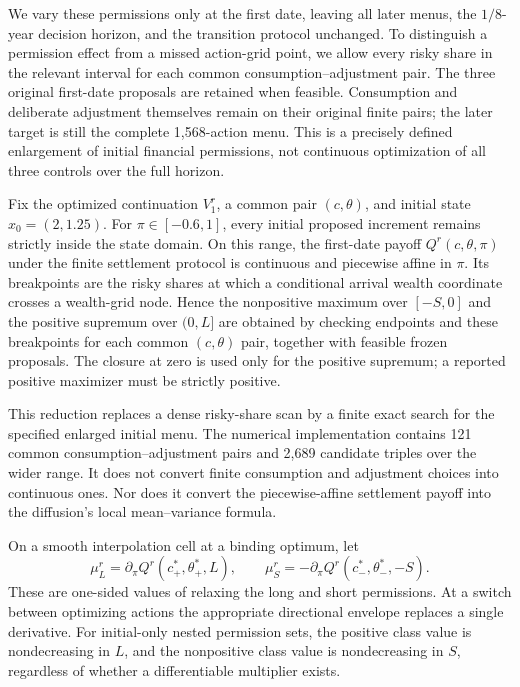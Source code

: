 We vary these permissions only at the first date, leaving all later menus, the $1/8$-year decision horizon, and the transition protocol unchanged. To distinguish a permission effect from a missed action-grid point, we allow every risky share in the relevant interval for each common consumption--adjustment pair. The three original first-date proposals are retained when feasible. Consumption and deliberate adjustment themselves remain on their original finite pairs; the later target is still the complete 1,568-action menu. This is a precisely defined enlargement of initial financial permissions, not continuous optimization of all three controls over the full horizon.

\begin{proposition}
\label{prop:r9_knots}
Fix the optimized continuation $V^r_1$, a common pair $(c,\theta)$, and initial state $x_0=(2,1.25)$. For $\pi\in[-0.6,1]$, every initial proposed increment remains strictly inside the state domain. On this range, the first-date payoff $Q^r(c,\theta,\pi)$ under the finite settlement protocol is continuous and piecewise affine in $\pi$. Its breakpoints are the risky shares at which a conditional arrival wealth coordinate crosses a wealth-grid node. Hence the nonpositive maximum over $[-S,0]$ and the positive supremum over $(0,L]$ are obtained by checking endpoints and these breakpoints for each common $(c,\theta)$ pair, together with feasible frozen proposals. The closure at zero is used only for the positive supremum; a reported positive maximizer must be strictly positive.
\end{proposition}

This reduction replaces a dense risky-share scan by a finite exact search for the specified enlarged initial menu. The numerical implementation contains 121 common consumption--adjustment pairs and 2,689 candidate triples over the wider range. It does not convert finite consumption and adjustment choices into continuous ones. Nor does it convert the piecewise-affine settlement payoff into the diffusion's local mean--variance formula.

On a smooth interpolation cell at a binding optimum, let
\begin{equation}
 \mu_L^r=\partial_\pi Q^r(c_+^*,\theta_+^*,L),\qquad
 \mu_S^r=-\partial_\pi Q^r(c_-^*,\theta_-^*,-S).
 \label{eq:r9_permission_prices}
\end{equation}
These are one-sided values of relaxing the long and short permissions. At a switch between optimizing actions the appropriate directional envelope replaces a single derivative. For initial-only nested permission sets, the positive class value is nondecreasing in $L$, and the nonpositive class value is nondecreasing in $S$, regardless of whether a differentiable multiplier exists.

